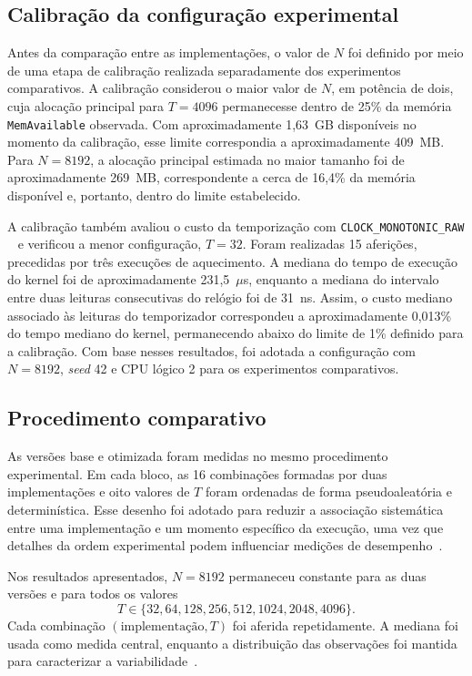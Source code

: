 \documentclass[11pt,a4paper]{article}
\begin{document}
\subsection{Calibração da configuração experimental}

Antes da comparação entre as implementações, o valor de $N$ foi definido por meio de uma etapa de calibração realizada separadamente dos experimentos comparativos. A calibração considerou o maior valor de $N$, em potência de dois, cuja alocação principal para $T=4096$ permanecesse dentro de 25\% da memória \texttt{MemAvailable} observada. Com aproximadamente 1,63~GB disponíveis no momento da calibração, esse limite correspondia a aproximadamente 409~MB. Para $N=8192$, a alocação principal estimada no maior tamanho foi de aproximadamente 269~MB, correspondente a cerca de 16,4\% da memória disponível e, portanto, dentro do limite estabelecido.

A calibração também avaliou o custo da temporização com \texttt{CLOCK\_MONOTONIC\_RAW} ~\cite{buttazzo2013ptask} e verificou a menor configuração, $T=32$. Foram realizadas 15 aferições, precedidas por três execuções de aquecimento. A mediana do tempo de execução do kernel foi de aproximadamente 231,5~$\mu$s, enquanto a mediana do intervalo entre duas leituras consecutivas do relógio foi de 31~ns. Assim, o custo mediano associado às leituras do temporizador correspondeu a aproximadamente 0,013\% do tempo mediano do kernel, permanecendo abaixo do limite de 1\% definido para a calibração. Com base nesses resultados, foi adotada a configuração com $N=8192$, \textit{seed} 42 e CPU lógico 2 para os experimentos comparativos.


\subsection{Procedimento comparativo}
As versões base e otimizada foram medidas no mesmo procedimento experimental. Em cada bloco, as 16 combinações formadas por duas implementações e oito valores de $T$ foram ordenadas de forma pseudoaleatória e determinística. Esse desenho foi adotado para reduzir a associação sistemática entre uma implementação e um momento específico da execução, uma vez que detalhes da ordem experimental podem influenciar medições de desempenho~\cite{mytkowicz2009}.

Nos resultados apresentados, $N=8192$ permaneceu constante para as duas versões e para todos os valores
\[
T\in\{32,64,128,256,512,1024,2048,4096\}.
\]
Cada combinação $(\text{implementação},T)$ foi aferida repetidamente. A mediana foi usada como medida central, enquanto a distribuição das observações foi mantida para caracterizar a variabilidade~\cite{kalibera2013rigorous}.
\end{document}
